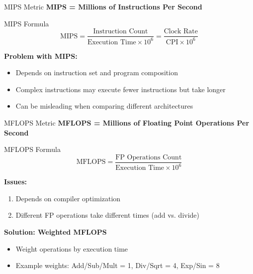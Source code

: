 \documentclass[aspectratio=169,12pt]{beamer}
\begin{document}
\begin{frame}{MIPS Metric}
\textbf{MIPS = Millions of Instructions Per Second}

\begin{block}{MIPS Formula}
$$\text{MIPS} = \frac{\text{Instruction Count}}{\text{Execution Time} \times 10^6} = \frac{\text{Clock Rate}}{\text{CPI} \times 10^6}$$
\end{block}

\textbf{Problem with MIPS:}
\begin{itemize}
    \item Depends on instruction set and program composition
    \item Complex instructions may execute fewer instructions but take longer
    \item Can be misleading when comparing different architectures
\end{itemize}
\end{frame}

\begin{frame}{MFLOPS Metric}
\textbf{MFLOPS = Millions of Floating Point Operations Per Second}

\begin{block}{MFLOPS Formula}
$$\text{MFLOPS} = \frac{\text{FP Operations Count}}{\text{Execution Time} \times 10^6}$$
\end{block}

\textbf{Issues:}
\begin{enumerate}
    \item Depends on compiler optimization
    \item Different FP operations take different times (add vs. divide)
\end{enumerate}

\textbf{Solution: Weighted MFLOPS}
\begin{itemize}
    \item Weight operations by execution time
    \item Example weights: Add/Sub/Mult = 1, Div/Sqrt = 4, Exp/Sin = 8
\end{itemize}
\end{frame}
\end{document}
